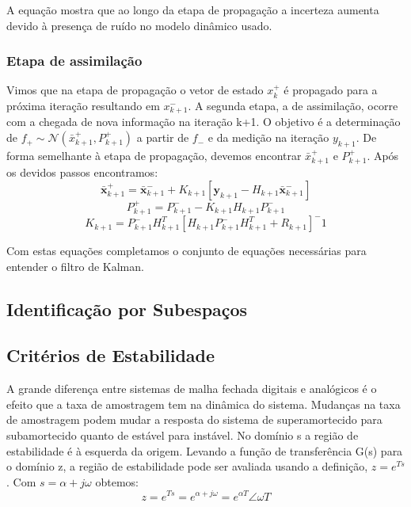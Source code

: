 A equação mostra que ao longo da etapa de propagação a incerteza aumenta devido à presença de ruído no modelo dinâmico usado.

\subsubsection{Etapa de assimilação}
Vimos que na etapa de propagação o vetor de estado $x^+_k$ é propagado para a próxima iteração resultando em $x^-_{k+1}$. A segunda etapa, a de assimilação, ocorre com a chegada de nova informação na iteração k+1. O objetivo é a determinação de $f_+ \sim \mathcal{N} (\bar{x}^+_{k+1},P^+_{k+1})$ a partir de $f_-$ e da medição na iteração $y_{k+1}$. De forma semelhante à etapa de propagação, devemos encontrar $\bar{x}^+_{k+1}$ e $P^+_{k+1}$. Após os devidos passos encontramos:
\begin{equation}
\bar{\mathbf{x}}^+_{k+1}=\bar{\mathbf{x}}^-_{k+1}+K_{k+1}[\mathbf{y}_{k+1}-H_{k+1} \bar{\mathbf{x}} ^-_{k+1}]
\end{equation}
\begin{equation}
P^+_{k+1}=P^-_{k+1}-K_{k+1} H_{k+1} P^-_{k+1}
\end{equation}
\begin{equation}
K_{k+1}=P^-_{k+1} H^T_{k+1}[H_{k+1} P^-_{k+1} H^T_{k+1}+R_{k+1}]^-1
\end{equation}

Com estas equações completamos o conjunto de equações necessárias para entender o filtro de Kalman.
\subsection {Identificação por Subespaços}

\subsection{Critérios de Estabilidade}
A grande diferença entre sistemas de malha fechada digitais e analógicos é o efeito que a taxa de amostragem tem na dinâmica do sistema. Mudanças na taxa de amostragem podem mudar a resposta do sistema de superamortecido para subamortecido quanto de estável para instável.
\newline
No domínio s a região de estabilidade é à esquerda da origem. Levando a função de transferência G(s) para o domínio z, a região de estabilidade pode ser avaliada usando a definição, $z=e^{Ts}$. Com $s=\alpha +j\omega$ obtemos:
\begin{equation}
z=e^{Ts}=e^{\alpha+j\omega}=e^{\alpha T}\angle \omega T
\end{equation}

